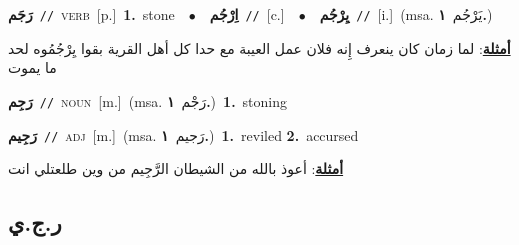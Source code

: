 \documentclass[10pt,a4paper,twoside]{article} %
\begin{document}
\begin{multicols}{2}
{\setlength\topsep{0pt}\textbf{\foreignlanguage{arabic}{رَجَم}}\ {\color{gray}\texttt{//}\color{black}}\ \textsc{verb}\ [p.]\ \textbf{1.}~stone\ \ $\bullet$\ \ \setlength\topsep{0pt}\textbf{\foreignlanguage{arabic}{اِرْجُم}}\ {\color{gray}\texttt{//}\color{black}}\ [c.]\ \ $\bullet$\ \ \setlength\topsep{0pt}\textbf{\foreignlanguage{arabic}{يِرْجُم}}\ {\color{gray}\texttt{//}\color{black}}\ [i.]\ \color{gray}(msa. \foreignlanguage{arabic}{يَرْجُم}~\foreignlanguage{arabic}{\textbf{١.}})\color{black}\  \begin{flushright}\color{gray}\foreignlanguage{arabic}{\textbf{\underline{\foreignlanguage{arabic}{أمثلة}}}: لما زمان كان ينعرف إِنه فلان عمل العيبة مع حدا كل أهل القرية بقوا يِرْجُمُوه لحد ما يموت}\end{flushright}\color{black}} \vspace{2mm}

{\setlength\topsep{0pt}\textbf{\foreignlanguage{arabic}{رَجِم}}\ {\color{gray}\texttt{//}\color{black}}\ \textsc{noun}\ [m.]\ \color{gray}(msa. \foreignlanguage{arabic}{رَجْم}~\foreignlanguage{arabic}{\textbf{١.}})\color{black}\ \textbf{1.}~stoning\ } \vspace{2mm}

{\setlength\topsep{0pt}\textbf{\foreignlanguage{arabic}{رَجِيم}}\ {\color{gray}\texttt{//}\color{black}}\ \textsc{adj}\ [m.]\ \color{gray}(msa. \foreignlanguage{arabic}{رَجيم}~\foreignlanguage{arabic}{\textbf{١.}})\color{black}\ \textbf{1.}~reviled  \textbf{2.}~accursed\  \begin{flushright}\color{gray}\foreignlanguage{arabic}{\textbf{\underline{\foreignlanguage{arabic}{أمثلة}}}: أعوذ بالله من الشيطان الرَّجِيم من وين طلعتلي انت}\end{flushright}\color{black}} \vspace{2mm}

\vspace{-3mm}
\subsection*{\color{blue}\foreignlanguage{arabic}{ر.ج.ي}\color{blue}{}} 


\end{multicols}
\end{document}
